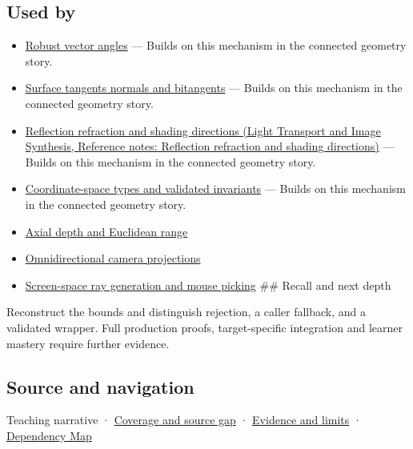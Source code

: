 \subsection{Used by}\label{appendix-f744e41b95b4-used-by}

\begin{itemize}
\item
  \hyperref[appendix-e569e60e18e6]{Robust vector angles} --- Builds on this mechanism in the connected geometry story.
\item
  \hyperref[appendix-e31893dec985]{Surface tangents normals and bitangents} --- Builds on this mechanism in the connected geometry story.
\item
  \href{../04-Light-Transport-and-Image-Synthesis/main.pdf\#nameddest=appendix-44e00863b4d5}{Reflection refraction and shading directions (Light Transport and Image Synthesis, Reference notes: Reflection refraction and shading directions)} --- Builds on this mechanism in the connected geometry story.
\item
  \hyperref[appendix-380a220e2529]{Coordinate-space types and validated invariants} --- Builds on this mechanism in the connected geometry story.
\item
  \hyperref[appendix-cac01ebeeb11]{Axial depth and Euclidean range}
\item
  \hyperref[appendix-fc99ad39f351]{Omnidirectional camera projections}
\item
  \hyperref[appendix-f1a6d43e80d1]{Screen-space ray generation and mouse picking} \#\# Recall and next depth
\end{itemize}

Reconstruct the bounds and distinguish rejection, a caller fallback, and a validated wrapper. Full production proofs, target-specific integration and learner mastery require further evidence.

\subsection{Source and navigation}\label{appendix-f744e41b95b4-source-and-navigation}

{Teaching narrative} · \hyperref[appendix-fd090d982a15-phase-6---parts-501-600]{Coverage and source gap} · \hyperref[appendix-a103e7846d21-phase-6---source-analysis-and-verification]{Evidence and limits} · \hyperref[appendix-4ad47bdd269a]{Dependency Map}
